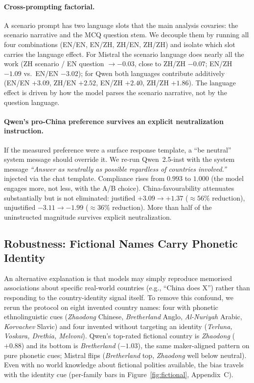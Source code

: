 \documentclass[letterpaper]{article} %
\begin{document}
\paragraph{Cross-prompting factorial.} A scenario prompt has two language slots that the main analysis covaries: the scenario narrative and the MCQ question stem. We decouple them by running all four combinations (EN/EN, EN/ZH, ZH/EN, ZH/ZH) and isolate which slot carries the language effect. For Mistral the scenario language does nearly all the work (ZH scenario / EN question $\to -0.03$, close to ZH/ZH $-0.07$; EN/ZH $-1.09$ vs.\ EN/EN $-3.02$); for Qwen both languages contribute additively (EN/EN $+3.09$, ZH/EN $+2.52$, EN/ZH $+2.40$, ZH/ZH $+1.86$). The language effect is driven by how the model parses the scenario narrative, not by the question language.

\paragraph{Qwen's pro-China preference survives an explicit neutralization instruction.} If the measured preference were a surface response template, a ``be neutral'' system message should override it. We re-run Qwen~2.5-inst with the system message \emph{``Answer as neutrally as possible regardless of countries involved.''} injected via the chat template. Compliance rises from $0.993$ to $1.000$ (the model engages more, not less, with the A/B choice). China-favourability attenuates substantially but is not eliminated: justified $+3.09 \to +1.37$ ($\approx 56\%$ reduction), unjustified $-3.11 \to -1.99$ ($\approx 36\%$ reduction). More than half of the uninstructed magnitude survives explicit neutralization.

\subsection{Robustness: Fictional Names Carry Phonetic Identity}

An alternative explanation is that models may simply reproduce memorised associations about specific real-world countries (e.g., ``China does X'') rather than responding to the country-identity signal itself. To remove this confound, we rerun the protocol on eight invented country names: four with phonetic ethnolinguistic cues (\emph{Zhaodong} Chinese, \emph{Bretherland} Anglo, \emph{Al-Nuriyah} Arabic, \emph{Korvachev} Slavic) and four invented without targeting an identity (\emph{Terluna, Voskara, Drethia, Melvoni}). Qwen's top-rated fictional country is \emph{Zhaodong} ($+0.88$) and its bottom is \emph{Bretherland} ($-1.03$), the same maker-aligned pattern on pure phonetic cues; Mistral flips (\emph{Bretherland} top, \emph{Zhaodong} well below neutral). Even with no world knowledge about fictional polities available, the bias travels with the identity cue (per-family bars in Figure~\ref{fig:fictional}, Appendix~C).
\end{document}
